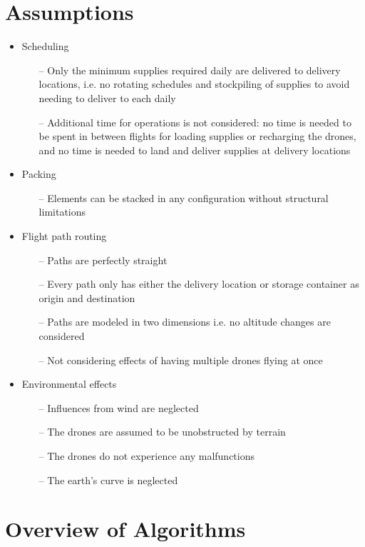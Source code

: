 \documentclass[twocolumn,10pt]{asme2ej}
\begin{document}
\section{Assumptions}

\begin{itemize}
	\item Scheduling
	\begin{itemize}
		\item[--] Only the minimum supplies required daily are delivered to delivery locations, i.e. no rotating schedules and stockpiling of supplies to avoid needing to deliver to each daily
		\item[--] Additional time for operations is not considered: no time is needed to be spent in between flights for loading supplies or recharging the drones, and no time is needed to land and deliver supplies at delivery locations
	\end{itemize}
    \item Packing
    \begin{itemize}
    	\item[--] Elements can be stacked in any configuration without structural limitations
    \end{itemize}
	\item Flight path routing
	\begin{itemize}
		\item[--] Paths are perfectly straight
		\item[--] Every path only has either the delivery location or storage container as origin and destination
		\item[--] Paths are modeled in two dimensions i.e. no altitude changes are considered
		\item[--] Not considering effects of having multiple drones flying at once
	\end{itemize}
	\item Environmental effects
	\begin{itemize}
		\item[--] Influences from wind are neglected
		\item[--] The drones are assumed to be unobstructed by terrain
		\item[--] The drones do not experience any malfunctions
		\item[--] The earth’s curve is neglected
	\end{itemize}
\end{itemize}


\section{Overview of Algorithms}
 
\end{document}

